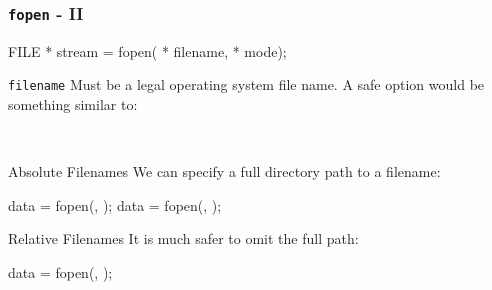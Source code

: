 \documentclass[smaller,handout,table]{beamer}
\begin{document}
\begin{frame}[fragile]
\frametitle{{\tt fopen} - II}
\begin{semiverbatim}
\small
FILE * stream = fopen( * filename,  * mode);
\end{semiverbatim}
\begin{block}{\tt filename}
Must be a legal operating system file name. A safe option would be something similar to:
\vspace{-0.1in}
\begin{center}
\tt {}
\end{center}
\end{block}

\begin{alertblock}{Absolute Filenames}
We can specify a full directory path to a filename:
\vspace{-0.2in}
\begin{semiverbatim}
\footnotesize
data = fopen(, ); 
data = fopen(, );      
\end{semiverbatim}
\end{alertblock}

\begin{exampleblock}{Relative Filenames}
It is much safer to omit the full path:
\vspace{-0.2in}
\begin{semiverbatim}
\footnotesize
data = fopen(, ); 
\end{semiverbatim}
\end{exampleblock}
\end{frame}
\end{document}
